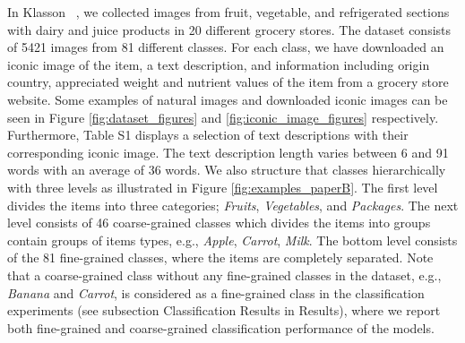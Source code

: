 In Klasson \etal~, we collected images from fruit, vegetable, and refrigerated sections with dairy and juice products in 20 different grocery stores.
The dataset consists of 5421 images from 81 different classes. For each class, we have downloaded an iconic image of the item, a text description, and information including origin country, appreciated weight and nutrient values of the item from a grocery store website. Some examples of natural images and downloaded iconic images can be seen in Figure \ref{fig:dataset_figures} and \ref{fig:iconic_image_figures} respectively. Furthermore, Table S1 displays a selection of text descriptions with their corresponding iconic image. 
The text description length varies between 6 and 91 words with an average of 36 words. 
We also structure that classes hierarchically with three levels as illustrated in Figure \ref{fig:examples_paperB}. The first level divides the items into three categories; \textit{Fruits}, \textit{Vegetables}, and \textit{Packages}. The next level consists of 46 coarse-grained classes which divides the items into groups contain groups of items types, e.g., \textit{Apple}, \textit{Carrot}, \textit{Milk}. The bottom level consists of the 81 fine-grained classes, where the items are completely separated. Note that a coarse-grained class without any fine-grained classes in the dataset, e.g., \textit{Banana} and \textit{Carrot}, is considered as a fine-grained class in the classification experiments (see subsection Classification Results in Results),
where we report both fine-grained and coarse-grained classification performance of the models.

